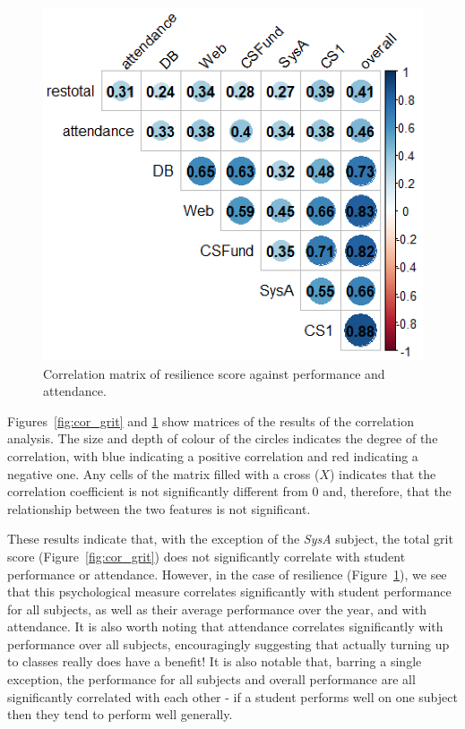 \documentclass[sigconf]{acmart}
\begin{document}
\begin{figure}[h]
\centering
\includegraphics[width=.9\linewidth]{images/cor_plot_res.png}
\caption{Correlation matrix of resilience score against performance and attendance.}
\label{fig:cor_res} 
\end{figure}

Figures~\ref{fig:cor_grit} and \ref{fig:cor_res} show matrices of the results of the correlation analysis. The size and depth of colour of the circles indicates the degree of the correlation, with blue indicating a positive correlation and red indicating a negative one. Any cells of the matrix filled with a cross ($X$) indicates that the correlation coefficient is not significantly different from 0 and, therefore, that the relationship between the two features is not significant.

These results indicate that, with the exception of the {\em SysA} subject, the total grit score (Figure~\ref{fig:cor_grit}) does not significantly correlate with student performance or attendance. However, in the case of resilience (Figure~\ref{fig:cor_res}), we see that this psychological measure correlates significantly with student performance for all subjects, as well as their average performance over the year, and with attendance. It is also worth noting that attendance correlates significantly with performance over all subjects, encouragingly suggesting that actually turning up to classes really does have a benefit! It is also notable that, barring a single exception, the performance for all subjects and overall performance are all significantly correlated with each other - if a student performs well on one subject then they tend to perform well generally. 
\end{document}
